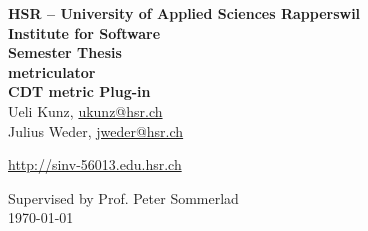 \documentclass[11pt,a4paper,oneside]{scrreprt}
\begin{document}
\begin{titlepage}
\begin{center}
\vspace{1,5cm}
{\Large \bfseries HSR -- University of Applied Sciences Rapperswil\\}
\vspace{0,25cm}
{\Large \bfseries Institute for Software\\}
\vspace{1cm}
{\Large \bfseries Semester Thesis\\}
\vspace{2cm}
\sffamily
{\Huge \bfseries metriculator}\\
\vspace{0.5cm}
{\Huge \bfseries CDT metric Plug-in}\\
\vspace{1cm}
Ueli Kunz, \url{ukunz@hsr.ch}\\
Julius Weder, \url{jweder@hsr.ch}
\\\vspace{1,0cm}
\begin{scriptsize}\url{http://sinv-56013.edu.hsr.ch}\\\end{scriptsize}
\vspace{1.5cm}
Supervised by Prof. Peter Sommerlad\\
\vspace{0,3cm}
\today
\end{center}
\end{titlepage}


\clearpage{}

\newpage
\thispagestyle{empty}
\mbox{}
\setcounter{page}{0}
\newpage
\end{document}
